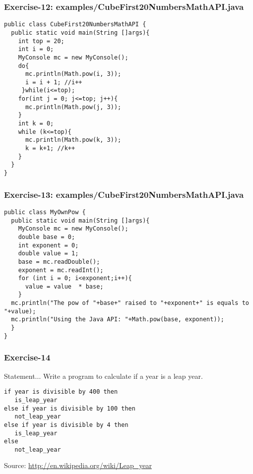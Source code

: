 \documentclass[xcolor=dvipsnames,dvip,notes=show,handout,table]{beamer}
\begin{document}


\begin{frame}[fragile]
\frametitle{Exercise-12: examples/CubeFirst20NumbersMathAPI.java}
\tiny
\begin{lstlisting}
public class CubeFirst20NumbersMathAPI {
  public static void main(String []args){
    int top = 20;
    int i = 0;
    MyConsole mc = new MyConsole();
    do{
      mc.println(Math.pow(i, 3));
      i = i + 1; //i++
     }while(i<=top);
    for(int j = 0; j<=top; j++){
      mc.println(Math.pow(j, 3));
    }
    int k = 0;
    while (k<=top){
      mc.println(Math.pow(k, 3));
      k = k+1; //k++
    }
  }
}
\end{lstlisting}
\end{frame}





\begin{frame}[fragile]
\frametitle{Exercise-13: examples/CubeFirst20NumbersMathAPI.java}
\tiny
\begin{lstlisting}
public class MyOwnPow {
  public static void main(String []args){
    MyConsole mc = new MyConsole();
    double base = 0;
    int exponent = 0;
    double value = 1;
    base = mc.readDouble();
    exponent = mc.readInt();
    for (int i = 0; i<exponent;i++){
      value = value  * base; 
    }
  mc.println("The pow of "+base+" raised to "+exponent+" is equals to "+value);
  mc.println("Using the Java API: "+Math.pow(base, exponent));
  }
}
\end{lstlisting}
\end{frame}



\begin{frame}[fragile]
\frametitle{Exercise-14}
\begin{block}{Statement...}
 Write a program to calculate if a year is a leap year.
\end{block}
\begin{lstlisting}
if year is divisible by 400 then
   is_leap_year
else if year is divisible by 100 then
   not_leap_year
else if year is divisible by 4 then
   is_leap_year
else
   not_leap_year
\end{lstlisting}

Source: \url{http://en.wikipedia.org/wiki/Leap\_year}
\end{frame}
\end{document}
